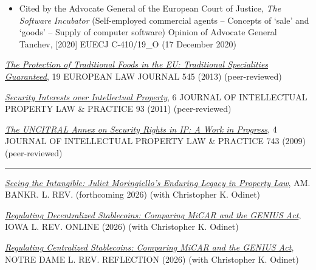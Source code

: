 \documentclass[
  11pt,
  letterpaper]{article}
\begin{document}
\begin{itemize}
\item Cited by the Advocate General of the European Court of Justice, \textit{The Software Incubator} (Self-employed commercial agents -- Concepts of `sale' and `goods' -- Supply of computer software) Opinion of Advocate General Tanchev, {[}2020{]} EUECJ C-410/19\_O (17 December 2020)
\end{itemize}

\vspace{0.5em}\noindent\href{https://www.andreatosato.com/articles/traditional-foods-eu}{\textit{The Protection of Traditional Foods in the EU: Traditional Specialities Guaranteed}},
19 {\fontsize{9.5}{11}\selectfont\MakeUppercase{European Law Journal}}
545 (2013) (peer-reviewed)

\vspace{0.5em}\noindent\href{https://www.andreatosato.com/articles/security-interests-ip}{\textit{Security Interests over Intellectual Property}},
6
{\fontsize{9.5}{11}\selectfont\MakeUppercase{Journal of Intellectual Property Law \& Practice}}
93 (2011) (peer-reviewed)

\vspace{0.5em}\noindent\href{https://www.andreatosato.com/articles/uncitral-annex-ip}{\textit{The UNCITRAL Annex on Security Rights in IP: A Work in Progress}},
4
{\fontsize{9.5}{11}\selectfont\MakeUppercase{Journal of Intellectual Property Law \& Practice}}
743 (2009) (peer-reviewed)

\vspace{0.25em}\hrule\vspace{0.7em}

\noindent\href{https://www.andreatosato.com/essays/seeing-the-intangible}{\textit{Seeing the Intangible: Juliet Moringiello's Enduring Legacy in Property Law}},
{\fontsize{9.5}{11}\selectfont\MakeUppercase{Am. Bankr. L. Rev.}}
(forthcoming 2026) (with Christopher K. Odinet)

\vspace{0.5em}\noindent\href{https://www.andreatosato.com/essays/regulating-decentralized-stablecoins}{\textit{Regulating Decentralized Stablecoins: Comparing MiCAR and the GENIUS Act}},
{\fontsize{9.5}{11}\selectfont\MakeUppercase{Iowa L. Rev. Online}}
(2026) (with Christopher K. Odinet)

\vspace{0.5em}\noindent\href{https://www.andreatosato.com/essays/regulating-stablecoins}{\textit{Regulating Centralized Stablecoins: Comparing MiCAR and the GENIUS Act}},
{\fontsize{9.5}{11}\selectfont\MakeUppercase{Notre Dame L. Rev. Reflection}}
(2026) (with Christopher K. Odinet)
\end{document}
